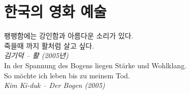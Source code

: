\documentclass{book}		%
\begin{document}
\flushright
\setcounter{chapter}{2}
\chapter{한국의 영화 예술}
\vspace{2cm}

팽팽함에는 강인함과 아름다운 소리가 있다.\\
죽을때 까지 활처럼 살고 싶다.\\
\emph{김기덕 -- 활 (2005년)}\\[1cm]
In der Spannung des Bogens liegen Stärke und Wohlklang.\\
So möchte ich leben bis zu meinem Tod.\\
\emph{Kim Ki-duk -- Der Bogen (2005)}
\end{document}
